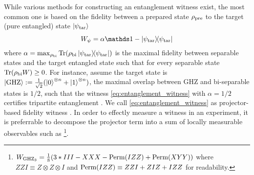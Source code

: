 \documentclass[
aps,
pra,
twocolumn,
floatfix,
]{revtex4-2}
\theoremstyle{plain}
\theoremstyle{definition}
\newtheorem{remark}{Remark}
\newcommand{\ew}{W}
\newcommand{\ob}{O}
\newcommand{\dm}{\rho}
\newcommand{\ghz}{\text{GHZ}}
\newcommand{\bi}{\text{bi}}
\newcommand{\perm}{\textup{Perm}}
\newcommand{\target}{\textup{tar}}
\newcommand{\prepare}{\textup{pre}}
\newcommand{\px}{X}
\newcommand{\pz}{Z}
\begin{document}
While various methods for constructing an entanglement witness exist, the most common one is based on the fidelity between a prepared state $\dm_{\prepare}$ to the target (pure entangled) state $\ket{\psi_{\target}}$
\begin{equation}
	\ew_{\psi} = \alpha\identity - \op{\psi_\target} 
	\label{eq:entanglement_witness}
\end{equation}
where $\alpha = \max_{\dm_{\bi}} \Tr(\dm_{\bi}\op{\psi_{\target}})$ is the maximal fidelity between separable states and the target entangled state such that for every separable state $\Tr(\dm_{\bi}\ew)\ge 0$.
For instance, assume the target state is $\ket{\ghz}:=\frac{1}{\sqrt{2}}(\ket{0}^{\otimes n} + \ket{1}^{\otimes n} )$,
the maximal overlap between GHZ and bi-separable states is $1/2$,
such that the witness \cref{eq:entanglement_witness} with $\alpha=1/2$ certifies tripartite entanglement
\cite{acinClassificationMixedThreequbit2001}.
We call \cref{eq:entanglement_witness} as projector-based fidelity witness \cite{bourennaneWitnessingMultipartiteEntanglement2004}.
In order to effectly measure a witness in an experiment, it is preferrable to decompose the projector term into a sum of locally measurable observables such as 
\footnote{
	$\ew_{\ghz_3} = \frac{1}{8} \qty( 3*III - \px\px\px - \perm(I\pz \pz ) + \perm(XYY))$
	where $\pz \pz I\equiv \pz \otimes\pz \otimes I$ and $\perm(I\pz \pz )\equiv \pz \pz I + \pz I\pz + I\pz \pz$ for readability. 
}.
\end{document}
